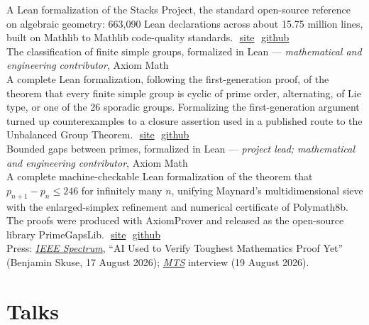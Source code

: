 \documentclass[11pt]{article} %
\begin{document}
A Lean formalization of the Stacks Project, the standard open-source reference on algebraic geometry: 663,090 Lean declarations across about 15.75 million lines, built on Mathlib to Mathlib code-quality standards.\,\, \textcolor[rgb]{0,0,1}{\href{https://stacks.axiommath.ai/}{site}}\,\, \textcolor[rgb]{0,0,1}{\href{https://github.com/AxiomMath/Stacks}{github}} \\
 The classification of finite simple groups, formalized in Lean --- \emph{mathematical and engineering contributor}, Axiom Math \\
A complete Lean formalization, following the first-generation proof, of the theorem that every finite simple group is cyclic of prime order, alternating, of Lie type, or one of the 26 sporadic groups. Formalizing the first-generation argument turned up counterexamples to a closure assertion used in a published route to the Unbalanced Group Theorem.\,\, \textcolor[rgb]{0,0,1}{\href{https://cfsg.axiommath.ai/}{site}}\,\, \textcolor[rgb]{0,0,1}{\href{https://github.com/AxiomMath/CFSG}{github}} \\
 Bounded gaps between primes, formalized in Lean --- \emph{project lead; mathematical and engineering contributor}, Axiom Math \\
A complete machine-checkable Lean formalization of the theorem that $p_{n+1}-p_n \leq 246$ for infinitely many $n$, unifying Maynard's multidimensional sieve with the enlarged-simplex refinement and numerical certificate of Polymath8b. The proofs were produced with AxiomProver and released as the open-source library PrimeGapsLib.\,\, \textcolor[rgb]{0,0,1}{\href{https://primegaps.axiommath.ai/}{site}}\,\, \textcolor[rgb]{0,0,1}{\href{https://github.com/AxiomMath/PrimeGapsLib}{github}} \\
Press: \textcolor[rgb]{0,0,1}{\href{https://spectrum.ieee.org/axiom-math-246-theorem-formalization}{\emph{IEEE Spectrum}}}, ``AI Used to Verify Toughest Mathematics Proof Yet'' (Benjamin Skuse, 17 August 2026); \textcolor[rgb]{0,0,1}{\href{https://x.com/MTSlive/status/2089875266487439457}{\emph{MTS}}} interview (19 August 2026).


\section*{Talks}
\end{document}
